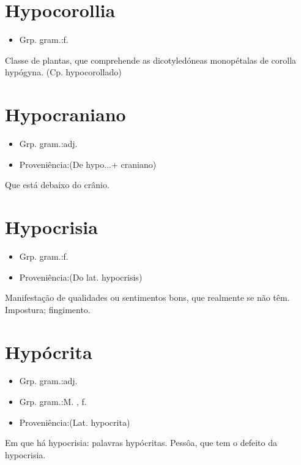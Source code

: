 \documentclass{article}
\begin{document}
\section{Hypocorollia}
\begin{itemize}
\item {Grp. gram.:f.}
\end{itemize}
Classe de plantas, que comprehende as dicotyledóneas monopétalas de corolla hypógyna.
(Cp. \textunderscore hypocorollado\textunderscore )
\section{Hypocraniano}
\begin{itemize}
\item {Grp. gram.:adj.}
\end{itemize}
\begin{itemize}
\item {Proveniência:(De \textunderscore hypo...\textunderscore  + \textunderscore craniano\textunderscore )}
\end{itemize}
Que está debaixo do crânio.
\section{Hypocrisia}
\begin{itemize}
\item {Grp. gram.:f.}
\end{itemize}
\begin{itemize}
\item {Proveniência:(Do lat. \textunderscore hypocrisis\textunderscore )}
\end{itemize}
Manifestação de qualidades ou sentimentos bons, que realmente se não têm.
Impostura; fingimento.
\section{Hypócrita}
\begin{itemize}
\item {Grp. gram.:adj.}
\end{itemize}
\begin{itemize}
\item {Grp. gram.:M. ,  f.}
\end{itemize}
\begin{itemize}
\item {Proveniência:(Lat. \textunderscore hypocrita\textunderscore )}
\end{itemize}
Em que há hypocrisia: \textunderscore palavras hypócritas\textunderscore .
Pessôa, que tem o defeito da hypocrisia.
\end{document}
